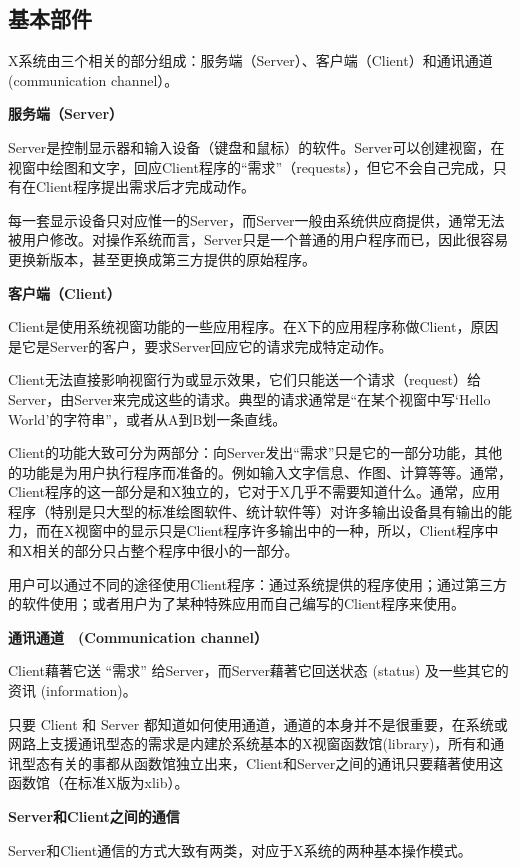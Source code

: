 \documentclass[doctor,openright,twoside]{sjtuthesis}
\theoremstyle{plain}
\theoremstyle{definition}
\theoremstyle{remark}
\theoremstyle{ocrenumbox}
\theoremstyle{plain}
\newcommand\cqh{“}
\newcommand\cqt{”}
\begin{document}
\subsection{基本部件}

X系统由三个相关的部分组成：服务端（Server）、客户端（Client）和通讯通道　(communication
channel）。

\textbf{服务端（Server）}

Server是控制显示器和输入设备（键盘和鼠标）的软件。Server可以创建视窗，在视窗中绘图和文字，回应Client程序的\cqh 需求\cqt （requests），但它不会自己完成，只有在Client程序提出需求后才完成动作。

每一套显示设备只对应惟一的Server，而Server一般由系统供应商提供，通常无法被用户修改。对操作系统而言，Server只是一个普通的用户程序而已，因此很容易更换新版本，甚至更换成第三方提供的原始程序。

\textbf{客户端（Client）}

Client是使用系统视窗功能的一些应用程序。在X下的应用程序称做Client，原因是它是Server的客户，要求Server回应它的请求完成特定动作。

Client无法直接影响视窗行为或显示效果，它们只能送一个请求（request）给Server，由Server来完成这些的请求。典型的请求通常是\cqh 在某个视窗中写`Hello
World'的字符串\cqt ，或者从A到B划一条直线。

Client的功能大致可分为两部分：向Server发出\cqh 需求\cqt 只是它的一部分功能，其他的功能是为用户执行程序而准备的。例如输入文字信息、作图、计算等等。通常，Client程序的这一部分是和X独立的，它对于X几乎不需要知道什么。通常，应用程序（特别是只大型的标准绘图软件、统计软件等）对许多输出设备具有输出的能力，而在X视窗中的显示只是Client程序许多输出中的一种，所以，Client程序中和X相关的部分只占整个程序中很小的一部分。

用户可以通过不同的途径使用Client程序：通过系统提供的程序使用；通过第三方的软件使用；或者用户为了某种特殊应用而自己编写的Client程序来使用。

\textbf{通讯通道　(Communication channel）}

Client藉著它送 ``需求'' 给Server，而Server藉著它回送状态 (status)
及一些其它的资讯 (information)。

只要 Client 和 Server
都知道如何使用通道，通道的本身并不是很重要，在系统或网路上支援通讯型态的需求是内建於系统基本的X视窗函数馆(library)，所有和通讯型态有关的事都从函数馆独立出来，Client和Server之间的通讯只要藉著使用这函数馆（在标准X版为xlib）。

\textbf{Server和Client之间的通信}

Server和Client通信的方式大致有两类，对应于X系统的两种基本操作模式。
\end{document}

